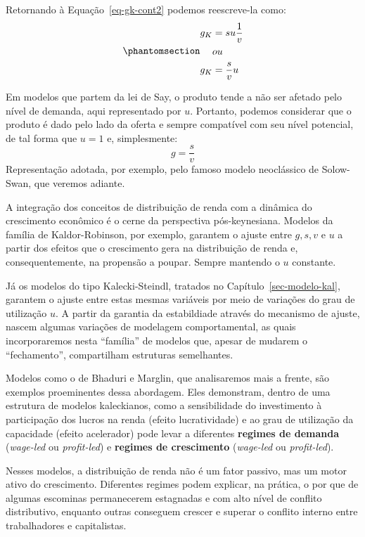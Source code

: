 \documentclass[
  brazilian,
  letterpaper,
  DIV=11,
  numbers=noendperiod]{scrreprt}
\begin{document}
Retornando à Equação~\ref{eq-gk-cont2} podemos reescreve-la como:
\begin{equation}\protect\phantomsection\label{eq-g-equilibrio}{
\begin{aligned}
g_K &= s u \frac{1}{v} \\
&ou\\
g_K &=\frac{s}{v} u
\end{aligned}
}\end{equation}

Em modelos que partem da lei de Say, o produto tende a não ser afetado
pelo nível de demanda, aqui representado por \(u\). Portanto, podemos
considerar que o produto é dado pelo lado da oferta e sempre compatível
com seu nível potencial, de tal forma que \(u=1\) e, simplesmente:
\[g=\frac{s}{v}\] Representação adotada, por exemplo, pelo famoso modelo
neoclássico de Solow-Swan, que veremos adiante.

A integração dos conceitos de distribuição de renda com a dinâmica do
crescimento econômico é o cerne da perspectiva pós-keynesiana. Modelos
da família de Kaldor-Robinson, por exemplo, garantem o ajuste entre
\(g, s, v\) e \(u\) a partir dos efeitos que o crescimento gera na
distribuição de renda e, consequentemente, na propensão a poupar. Sempre
mantendo o \(u\) constante.

Já os modelos do tipo Kalecki-Steindl, tratados no
Capítulo~\ref{sec-modelo-kal}, garantem o ajuste entre estas mesmas
variáveis por meio de variações do grau de utilização \(u\). A partir da
garantia da estabildiade através do mecanismo de ajuste, nascem algumas
variações de modelagem comportamental, as quais incorporaremos nesta
``família'' de modelos que, apesar de mudarem o ``fechamento'',
compartilham estruturas semelhantes.

Modelos como o de Bhaduri e Marglin, que analisaremos mais a frente, são
exemplos proeminentes dessa abordagem. Eles demonstram, dentro de uma
estrutura de modelos kaleckianos, como a sensibilidade do investimento à
participação dos lucros na renda (efeito lucratividade) e ao grau de
utilização da capacidade (efeito acelerador) pode levar a diferentes
\textbf{regimes de demanda} (\emph{wage-led} ou \emph{profit-led}) e
\textbf{regimes de crescimento} (\emph{wage-led} ou \emph{profit-led}).

Nesses modelos, a distribuição de renda não é um fator passivo, mas um
motor ativo do crescimento. Diferentes regimes podem explicar, na
prática, o por que de algumas escominas permanecerem estagnadas e com
alto nível de conflito distributivo, enquanto outras conseguem crescer e
superar o conflito interno entre trabalhadores e capitalistas.
\end{document}
